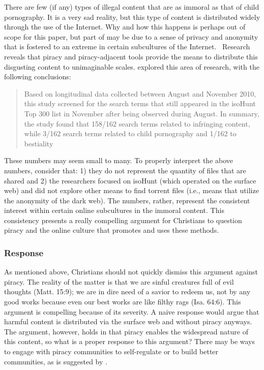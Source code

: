 \documentclass[onecolumn, 12pt]{article}
\begin{document}
\begin{refsection}
There are few (if any) types of illegal content that are as immoral as that of
child pornography. It is a very sad reality, but this type of content is
distributed widely through the use of the Internet. Why and how this happens is
perhaps out of scope for this paper, but part of may be due to a sense of
privacy and anonymity that is fostered to an extreme in certain subcultures of
the Internet.~\cite[588]{prichard:subcultures} Research reveals that piracy and
piracy-adjacent tools provide the means to distribute this disgusting content
to unimaginable scales. \citeauthor{prichard:subcultures} explored this area of
research, with the following conclusions:
\blockcquote[593]{prichard:subcultures}{%
  Based on longitudinal data collected between August and November 2010, this
  study screened for the search terms that still appeared in the isoHunt Top
  300 list in November after being observed during August. In summary, the
  study found that 158/162 search terms related to infringing content, while
  3/162 search terms related to child pornography and 1/162 to bestiality%
}
These numbers may seem small to many. To properly interpret the above numbers,
consider that: 1) they do not represent the quantity of files that are shared
and 2) the researchers focused on isoHunt (which operated on the surface web)
and did not explore other means to find torrent files (i.e., means that utilize
the anonymity of the dark web). The numbers, rather, represent the consistent
interest within certain online subcultures in the immoral content. This
consistency presents a really compelling argument for Christians to question
piracy and the online culture that promotes and uses these methods.

\subsubsection{Response}
As mentioned above, Christians should not quickly dismiss this argument against
piracy. The reality of the matter is that we are sinful creatures full of
evil thoughts (Matt. 15:9); we are in dire need of a savior to redeem us, not
by any good works because even our best works are like filthy rags (Isa. 64:6).
This argument is compelling because of its severity. A naive response would
argue that harmful content is distributed via the surface web and without
piracy anyways. The argument, however, holds in that piracy enables the
widespread nature of this content, so what is a proper response to this
argument? There may be ways to engage with piracy communities to self-regulate
or to build better communities, as is suggested by
\citeauthor{prichard:subcultures}.~\cite[595--596]{prichard:subcultures}


\end{refsection}
\end{document}
